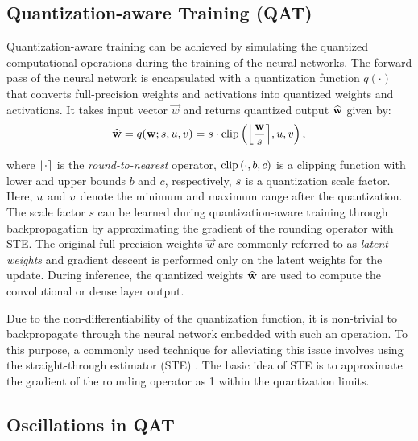 \subsection{Quantization-aware Training 
(\acrshort{QAT})}
\label{sec:prelim-qat}
Quantization-aware training can be achieved by simulating the quantized computational operations during the training of the neural networks. The forward pass of the neural network is encapsulated with a quantization function $q(\cdot)$ that converts full-precision weights and activations into quantized weights and activations. It takes input vector $\vec{w}$ and returns quantized output $\vecq{w}$ given by:
\begin{equation}
    \label{eq:quantization_formulation}
    \vecq{w} = q(\vec{w}; s, u, v) = \ct{s} \cdot \clip{\round*{\frac{\vec{w}}{\ct{s}}}}{\ct{u}}{\ct{v}}, 
\end{equation} 

where $\round*{\cdot}$ is the \textit{round-to-nearest} operator, $\clip{\cdot}{b}{c}$ is a clipping function with lower and upper bounds $b$ and $c$, respectively, $\ct{s}$ is a quantization scale factor. Here, $\ct{u}$ and $\ct{v}$ denote the minimum and maximum range after the quantization. The scale factor $s$ can be learned \cite{lsq, lsq+} during quantization-aware training through backpropagation by approximating the gradient of the rounding operator with \acrshort{STE}. The original full-precision weights $\vec{w}$ are commonly referred to as \textit{latent weights} and gradient descent is performed only on the latent weights for the update. During inference, the quantized weights $\vecq{w}$ are used to compute the convolutional or dense layer output.

Due to the non-differentiability of the quantization function, it is non-trivial to backpropagate through the neural network embedded with such an operation. To this purpose, a commonly used technique for alleviating this issue involves using the straight-through estimator (\acrshort{STE}) \cite{bengio2013estimating, hinton2012ste}. The basic idea of \acrshort{STE} is to approximate the gradient of the rounding operator as 1 within the quantization limits. 

\subsection{Oscillations in \acrshort{QAT}}


